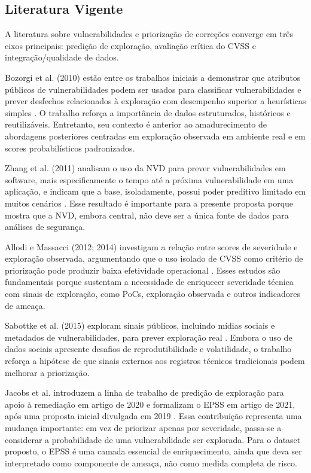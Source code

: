 \subsection{Literatura Vigente}

A literatura sobre vulnerabilidades e priorização de correções converge em três eixos principais: predição de exploração, avaliação crítica do CVSS e integração/qualidade de dados.

Bozorgi et al. (2010) estão entre os trabalhos iniciais a demonstrar que atributos públicos de vulnerabilidades podem ser usados para classificar vulnerabilidades e prever desfechos relacionados à exploração com desempenho superior a heurísticas simples \cite{bozorgi2010_beyond_heuristics}. O trabalho reforça a importância de dados estruturados, históricos e reutilizáveis. Entretanto, seu contexto é anterior ao amadurecimento de abordagens posteriores centradas em exploração observada em ambiente real e em scores probabilísticos padronizados.

Zhang et al. (2011) analisam o uso da NVD para prever vulnerabilidades em software, mais especificamente o tempo até a próxima vulnerabilidade em uma aplicação, e indicam que a base, isoladamente, possui poder preditivo limitado em muitos cenários \cite{zhang2011_nvd_predict,zhang2015_nvd_cyber_risks}. Esse resultado é importante para a presente proposta porque mostra que a NVD, embora central, não deve ser a única fonte de dados para análises de segurança.

Allodi e Massacci (2012; 2014) investigam a relação entre scores de severidade e exploração observada, argumentando que o uso isolado de CVSS como critério de priorização pode produzir baixa efetividade operacional \cite{allodi2012_preliminary,allodi2014_case_control}. Esses estudos são fundamentais porque sustentam a necessidade de enriquecer severidade técnica com sinais de exploração, como PoCs, exploração observada e outros indicadores de ameaça.

Sabottke et al. (2015) exploram sinais públicos, incluindo mídias sociais e metadados de vulnerabilidades, para prever exploração real \cite{sabottke2015_social_media}. Embora o uso de dados sociais apresente desafios de reprodutibilidade e volatilidade, o trabalho reforça a hipótese de que sinais externos aos registros técnicos tradicionais podem melhorar a priorização.

Jacobs et al. introduzem a linha de trabalho de predição de exploração para apoio à remediação em artigo de 2020 e formalizam o EPSS em artigo de 2021, após uma proposta inicial divulgada em 2019 \cite{jacobs2020_remediation,jacobs2019_epss,jacobs2021_epss}. Essa contribuição representa uma mudança importante: em vez de priorizar apenas por severidade, passa-se a considerar a probabilidade de uma vulnerabilidade ser explorada. Para o dataset proposto, o EPSS é uma camada essencial de enriquecimento, ainda que deva ser interpretado como componente de ameaça, não como medida completa de risco.

